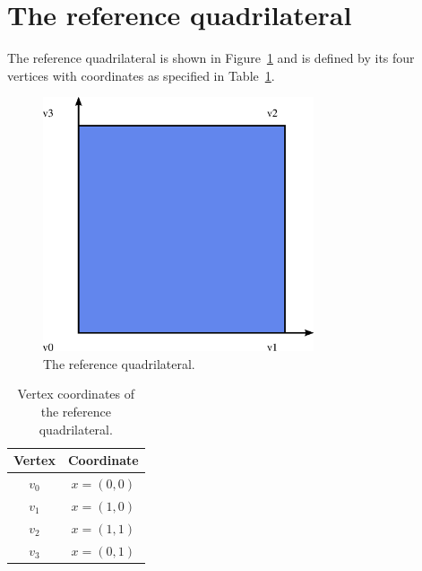 \section{The reference quadrilateral}

The reference quadrilateral is shown in Figure~\ref{fig:quadrilateral}
and is defined by its four vertices with coordinates as specified in
Table~\ref{tab:quadrilateral,vertices}.

\begin{figure}
  \begin{center}
    \includegraphics[width=8cm]{eps/quadrilateral.eps}
    \caption{The reference quadrilateral.}
    \label{fig:quadrilateral}
  \end{center}
\end{figure}

\begin{table}
\linespread{1.2}\selectfont
  \begin{center}
    \begin{tabular}{|c|c|}
      \hline
      Vertex & Coordinate \\
      \hline
      \hline
      $v_0$ & $x = (0, 0)$ \\
      \hline
      $v_1$ & $x = (1, 0)$ \\
      \hline
      $v_2$ & $x = (1, 1)$ \\
      \hline
      $v_3$ & $x = (0, 1)$ \\
      \hline
    \end{tabular}
    \caption{Vertex coordinates of the reference quadrilateral.}
    \label{tab:quadrilateral,vertices}
  \end{center}
\end{table}

